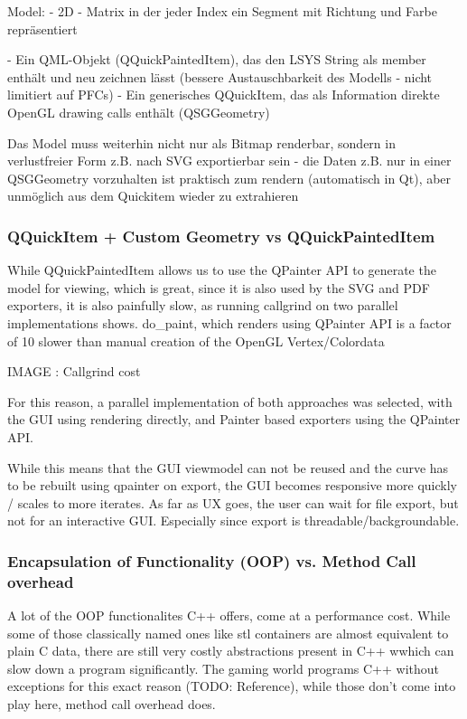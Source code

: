 Model: - 2D - Matrix in der jeder Index ein Segment mit Richtung und Farbe repräsentiert

- Ein QML-Objekt (QQuickPaintedItem), das den LSYS String als member enthält und neu zeichnen lässt (bessere Austauschbarkeit des Modells - nicht limitiert auf PFCs)
- Ein generisches QQuickItem, das als Information direkte OpenGL drawing calls enthält (QSGGeometry)

Das Model muss weiterhin nicht nur als Bitmap renderbar, sondern in verlustfreier Form z.B. nach SVG exportierbar sein - die Daten z.B. nur in einer QSGGeometry vorzuhalten ist praktisch zum rendern (automatisch in Qt), aber unmöglich aus dem Quickitem wieder zu extrahieren
\subsubsection{QQuickItem + Custom Geometry vs QQuickPaintedItem}
While QQuickPaintedItem allows us to use the QPainter API to generate the model for viewing, which is great, since it is also used by the SVG and PDF exporters, it is also painfully slow, as running callgrind on two parallel implementations shows.
do\_paint, which renders using QPainter API is a factor of 10 slower than manual creation of the OpenGL Vertex/Colordata

IMAGE : Callgrind cost

For this reason, a parallel implementation of both approaches was selected, with the GUI using rendering directly, and Painter based exporters using the QPainter API.

While this means that the GUI viewmodel can not be reused and the curve has to be rebuilt using qpainter on export, the GUI becomes responsive more quickly / scales to more iterates. As far as UX goes, the user can wait for file export, but not for an interactive GUI.
Especially since export is threadable/backgroundable.

\subsubsection{Encapsulation of Functionality (OOP) vs. Method Call overhead}
A lot of the OOP functionalites C++ offers, come at a performance cost.
While some of those classically named ones like stl containers are almost equivalent to plain C data, there are still very costly abstractions present in C++ wwhich can slow down a program significantly.
The gaming world programs C++ without exceptions for this exact reason (TODO: Reference), while those don't come into play here, method call overhead does.


